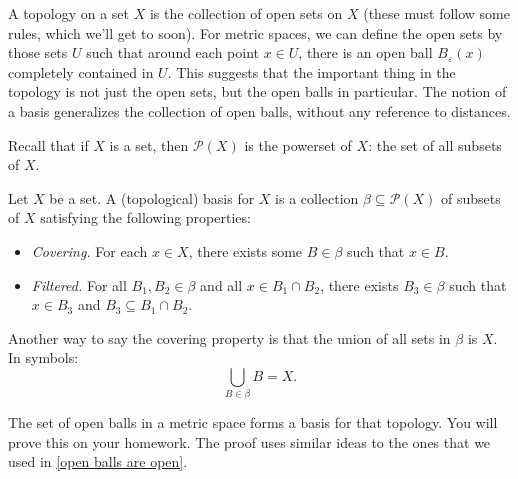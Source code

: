 \documentclass[noname]{notes}
\begin{document}
A topology on a set $X$ is the collection of open sets on $X$ (these must follow some rules, which we'll get to soon). For metric spaces, we can define the open sets by those sets $U$ such that around each point $x \in U$, there is an open ball $B_\varepsilon(x)$ completely contained in $U$. This suggests that the important thing in the topology is not just the open sets, but the open balls in particular. The notion of a basis generalizes the collection of open balls, without any reference to distances. 

Recall that if $X$ is a set, then $\mathcal P(X)$ is the powerset of $X$: the set of all subsets of $X$. 

\begin{definition}
	Let $X$ be a set. A (topological) basis for $X$ is a collection $\beta \subseteq \mathcal P(X)$ of subsets of $X$ satisfying the following properties: 
	\begin{itemize}
		\item \emph{Covering.} For each $x \in X$, there exists some $B \in \beta$ such that $x \in B$. 
		\item \emph{Filtered.} For all $B_1, B_2 \in \beta$ and all $x \in B_1 \cap B_2$, there exists $B_3 \in \beta$ such that $x \in B_3$ and $B_3 \subseteq B_1 \cap B_2$. 
	\end{itemize}
\end{definition}
\noindent Another way to say the covering property is that the union of all sets in $\beta$ is $X$. In symbols: 
\[
	\bigcup_{B \in \beta} B = X.
\]

\begin{example}
	The set of open balls in a metric space forms a basis for that topology. You will prove this on your homework. The proof uses similar ideas to the ones that we used in \cref{open balls are open}.
\end{example}
\end{document}
